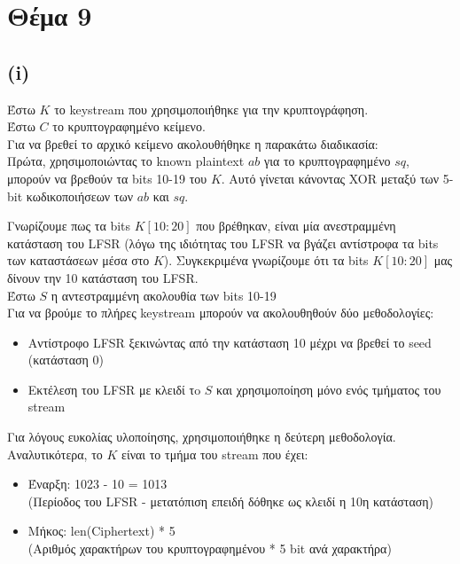 \documentclass[a4paper, 11pt]{article}
\newcommand{\lt}{\latintext}
\begin{document}
\newpage


\section*{Θέμα 9}
\subsection*{{\lt (i)}}
Έστω $K$ το {\lt keystream} που χρησιμοποιήθηκε για την κρυπτογράφηση.\\
Έστω $C$ το κρυπτογραφημένο κείμενο.\\
Για να βρεθεί το αρχικό κείμενο ακολουθήθηκε η παρακάτω διαδικασία:\\

Πρώτα, χρησιμοποιώντας το {\lt known plaintext} $ab$ για το κρυπτογραφημένο $sq$, μπορούν να βρεθούν τα {\lt bits} 10-19 του $Κ$.
Αυτό γίνεται κάνοντας {\lt XOR} μεταξύ των 5-{\lt bit} κωδικοποιήσεων των $ab$ και $sq$.

Γνωρίζουμε πως τα {\lt bits} $Κ[10:20]$ που βρέθηκαν, είναι μία ανεστραμμένη κατάσταση του {\lt LFSR} (λόγω της ιδιότητας του {\lt LFSR} να βγάζει
αντίστροφα τα {\lt bits} των καταστάσεων μέσα στο $K$). Συγκεκριμένα γνωρίζουμε ότι τα {\lt bits} $Κ[10:20]$ μας δίνουν την 10 κατάσταση του {\lt LFSR}.\\

\noindent Έστω $S$ η αντεστραμμένη ακολουθία των {\lt bits} 10-19\\

Για να βρούμε το πλήρες {\lt keystream} μπορούν να ακολουθηθούν δύο μεθοδολογίες:

\begin{itemize}
\item Αντίστροφο {\lt LFSR} ξεκινώντας από την κατάσταση 10 μέχρι να βρεθεί το {\lt seed} (κατάσταση 0)
\item Εκτέλεση του {\lt LFSR} με κλειδί τo $S$ και χρησιμοποίηση μόνο ενός τμήματος του {\lt stream}
\end{itemize}

Για λόγους ευκολίας υλοποίησης, χρησιμοποιήθηκε η δεύτερη μεθοδολογία. Αναλυτικότερα, το $Κ$ είναι το τμήμα του {\lt stream} που έχει:\\
\begin{itemize}
\item Έναρξη: 1023 - 10 = 1013 \\(Περίοδος του {\lt LFSR} - μετατόπιση επειδή δόθηκε ως κλειδί η 10η κατάσταση)\\
\item Μήκος: {\lt len(Ciphertext)} * 5 \\(Αριθμός χαρακτήρων του κρυπτογραφημένου * 5 {\lt bit} ανά χαρακτήρα)\\
\end{itemize}
\end{document}
